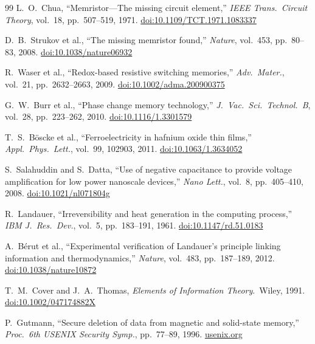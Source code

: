 \documentclass[11pt,a4paper,openany]{book}
\theoremstyle{definition}
\theoremstyle{plain}
\theoremstyle{remark}
\begin{document}
\begin{thebibliography}{99}
L.~O.~Chua, ``Memristor---The missing circuit element,''
\textit{IEEE Trans.\ Circuit Theory}, vol.\ 18, pp.\ 507--519, 1971.
\href{https://doi.org/10.1109/TCT.1971.1083337}{doi:10.1109/TCT.1971.1083337}

D.~B.~Strukov et al., ``The missing memristor found,''
\textit{Nature}, vol.\ 453, pp.\ 80--83, 2008.
\href{https://doi.org/10.1038/nature06932}{doi:10.1038/nature06932}

R.~Waser et al., ``Redox-based resistive switching memories,''
\textit{Adv.\ Mater.}, vol.\ 21, pp.\ 2632--2663, 2009.
\href{https://doi.org/10.1002/adma.200900375}{doi:10.1002/adma.200900375}

G.~W.~Burr et al., ``Phase change memory technology,''
\textit{J.\ Vac.\ Sci.\ Technol.\ B}, vol.\ 28, pp.\ 223--262, 2010.
\href{https://doi.org/10.1116/1.3301579}{doi:10.1116/1.3301579}

T.~S.~B\"{o}scke et al., ``Ferroelectricity in hafnium oxide thin films,''
\textit{Appl.\ Phys.\ Lett.}, vol.\ 99, 102903, 2011.
\href{https://doi.org/10.1063/1.3634052}{doi:10.1063/1.3634052}

S.~Salahuddin and S.~Datta, ``Use of negative capacitance to provide
voltage amplification for low power nanoscale devices,''
\textit{Nano Lett.}, vol.\ 8, pp.\ 405--410, 2008.
\href{https://doi.org/10.1021/nl071804g}{doi:10.1021/nl071804g}

R.~Landauer, ``Irreversibility and heat generation in the computing
process,''
\textit{IBM J.\ Res.\ Dev.}, vol.\ 5, pp.\ 183--191, 1961.
\href{https://doi.org/10.1147/rd.51.0183}{doi:10.1147/rd.51.0183}

A.~B\'{e}rut et al., ``Experimental verification of Landauer's principle
linking information and thermodynamics,''
\textit{Nature}, vol.\ 483, pp.\ 187--189, 2012.
\href{https://doi.org/10.1038/nature10872}{doi:10.1038/nature10872}

T.~M.~Cover and J.~A.~Thomas, \textit{Elements of Information Theory}.\
Wiley, 1991.
\href{https://doi.org/10.1002/047174882X}{doi:10.1002/047174882X}

P.~Gutmann, ``Secure deletion of data from magnetic and solid-state
memory,''
\textit{Proc.\ 6th USENIX Security Symp.}, pp.\ 77--89, 1996.
\href{https://www.usenix.org/legacy/publications/library/proceedings/sec96/full_papers/gutmann/}{usenix.org}


\end{thebibliography}
\end{document}
